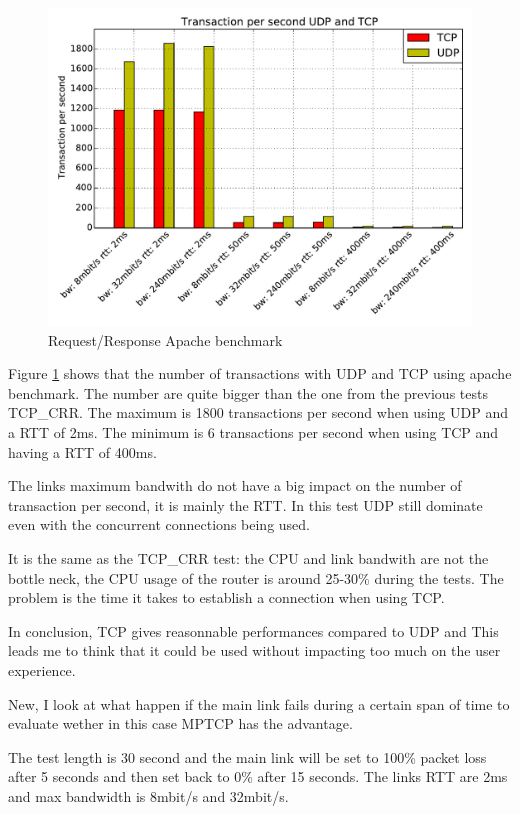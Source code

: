    \begin{figure}[h!]
    \centering
    \includegraphics[width=1\textwidth]{../results/all_request_response_ab.pdf}
    \caption{Request/Response Apache benchmark}
    \label{all_request_response_ab}
  \end{figure}

Figure \ref{all_request_response_ab} shows that the number of transactions with UDP and TCP using apache benchmark. The number are quite bigger than the one from the previous tests TCP\_CRR.
The maximum is 1800 transactions per second when using UDP and a RTT of 2ms. The minimum is 6 transactions per second when using TCP and having a RTT of 400ms.

The links maximum bandwith do not have a big impact on the number of transaction per second, it is
mainly the RTT. In this test UDP still dominate even with the concurrent connections being used.

It is the same as the TCP\_CRR test: the CPU and link bandwith are not the bottle neck,
the CPU usage of the router is around 25-30\% during the tests. The problem is the time it takes to establish a connection when using TCP.

In conclusion, TCP gives reasonnable performances compared to UDP and This leads me to think that it could be used without impacting too much on the user experience.

New, I look at what happen if the main link fails during a certain span of time to evaluate wether in this case MPTCP has the advantage.

The test length is 30 second and the main link will be set to 100\% packet loss after 5 seconds and then set back to 0\% after 15 seconds.
The links RTT are 2ms and max bandwidth is 8mbit/s and 32mbit/s.

